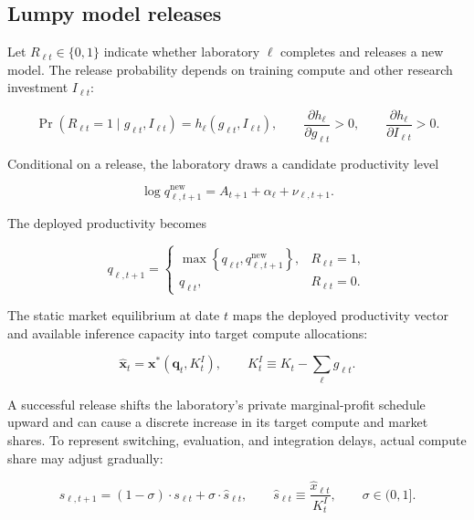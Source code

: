 \documentclass[11pt]{article}
\begin{document}
\subsection{Lumpy model releases}

Let $R_{\ell t}\in\{0,1\}$ indicate whether laboratory $\ell$ completes and releases a new model. The release probability depends on training compute and other research investment $I_{\ell t}$:

\begin{equation}\Pr\left(R_{\ell t}=1\mid g_{\ell t},I_{\ell t}\right)=h_\ell(g_{\ell t},I_{\ell t}),\qquad \frac{\partial h_\ell}{\partial g_{\ell t}}>0,\qquad \frac{\partial h_\ell}{\partial I_{\ell t}}>0.\end{equation}

Conditional on a release, the laboratory draws a candidate productivity level

\begin{equation}\log q_{\ell,t+1}^{\mathrm{new}}=A_{t+1}+\alpha_\ell+\nu_{\ell,t+1}.\end{equation}

The deployed productivity becomes

\begin{equation}q_{\ell,t+1}=\begin{cases}\max\left\{q_{\ell t},q_{\ell,t+1}^{\mathrm{new}}\right\},&R_{\ell t}=1,\\q_{\ell t},&R_{\ell t}=0.\end{cases}\end{equation}

The static market equilibrium at date $t$ maps the deployed productivity vector and available inference capacity into target compute allocations:

\begin{equation}\widehat{\mathbf x}_t=\mathbf x^*(\mathbf q_t,K_t^I),\qquad K_t^I\equiv K_t-\sum_\ell g_{\ell t}.\end{equation}

A successful release shifts the laboratory's private marginal-profit schedule upward and can cause a discrete increase in its target compute and market shares. To represent switching, evaluation, and integration delays, actual compute share may adjust gradually:

\begin{equation}s_{\ell,t+1}=\left(1-\sigma\right)\cdot s_{\ell t}+\sigma\cdot\widehat s_{\ell t},\qquad \widehat s_{\ell t}\equiv\frac{\widehat x_{\ell t}}{K_t^I},\qquad \sigma\in(0,1].\end{equation}
\end{document}
